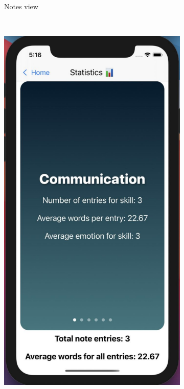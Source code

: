 \documentclass{l4proj}
\begin{document}
\begin{figure}
\begin{subfigure}[b]{0.3\textwidth}
        \caption{Notes view}
        \label{fig:appRecordingsScreen}
    \end{subfigure}
    ~ %
    \begin{subfigure}[b]{0.3\textwidth}
        \includegraphics[scale=0.25]{images/appStatScreen.pdf}

\end{subfigure}
\end{figure}
\end{document}
